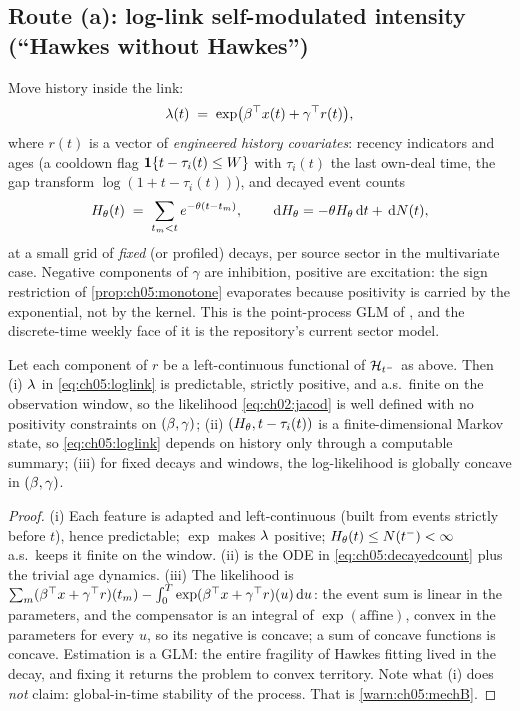 \subsection*{Route (a): log-link self-modulated intensity (``Hawkes
without Hawkes'')}

Move history inside the link:
\begin{equation}\label{eq:ch05:loglink}
\lambda(t) \;=\; \exp\!\big(\beta^\top x(t) + \gamma^\top r(t)\big),
\end{equation}
where $r(t)$ is a vector of \emph{engineered history covariates}:
recency indicators and ages (a cooldown flag $\mathbf{1}\{t - \tau_i(t) \le W\}$
with $\tau_i(t)$ the last own-deal time, the gap transform $\log(1 +
t-\tau_i(t))$), and decayed event counts
\begin{equation}\label{eq:ch05:decayedcount}
H_{\theta}(t) \;=\; \sum_{t_m < t} e^{-\theta (t - t_m)},
\qquad \,\mathrm{d} H_{\theta} = -\theta H_{\theta}\,\mathrm{d} t + \,\mathrm{d} N(t),
\end{equation}
at a small grid of \emph{fixed} (or profiled) decays, per source sector in
the multivariate case. Negative components of $\gamma$ are inhibition,
positive are excitation: the sign restriction of
\cref{prop:ch05:monotone} evaporates because positivity is carried by the
exponential, not by the kernel. This is the point-process GLM of
\citet{truccolo2005}, and the discrete-time weekly face of it is the
repository's current sector model.

\begin{proposition}\label{prop:ch05:loglinkvalid}
Let each component of $r$ be a left-continuous functional of
$\mathcal{H}_{t^-}$ as above. Then (i) $\lambda$ in \cref{eq:ch05:loglink} is
predictable, strictly positive, and a.s.\ finite on the observation
window, so the likelihood \cref{eq:ch02:jacod} is well defined with no
positivity constraints on $(\beta,\gamma)$; (ii) $(H_{\theta}, t -
\tau_i(t))$ is a finite-dimensional Markov state, so \cref{eq:ch05:loglink}
depends on history only through a computable summary; (iii) for fixed
decays and windows, the log-likelihood is globally concave in
$(\beta,\gamma)$.
\end{proposition}

\begin{proof}
(i) Each feature is adapted and left-continuous (built from events
strictly before $t$), hence predictable; $\exp$ makes $\lambda$ positive;
$H_{\theta}(t) \le N(t^-) < \infty$ a.s.\ keeps it finite on the window.
(ii) is the ODE in \cref{eq:ch05:decayedcount} plus the trivial age
dynamics. (iii) The likelihood is $\sum_m (\beta^\top x +
\gamma^\top r)(t_m) - \int_0^{T} \exp(\beta^\top x +
\gamma^\top r)(u)\,\mathrm{d} u$: the event sum is linear in the parameters, and
the compensator is an integral of $\exp(\text{affine})$, convex in the
parameters for every $u$, so its negative is concave; a sum of concave
functions is concave. Estimation is a GLM: the entire fragility of Hawkes
fitting lived in the decay, and fixing it returns the problem to convex
territory. Note what (i) does \emph{not} claim: global-in-time stability
of the process. That is \cref{warn:ch05:mechB}.
\end{proof}

